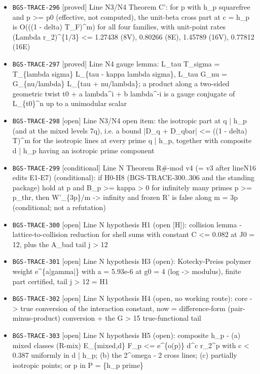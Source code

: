 \begin{itemize}
  \item \texttt{BGS-TRACE-296} [proved] Line N3/N4 Theorem C': for p with h\_p squarefree and p >= p0 (effective, not computed), the unit-beta cross part at c = h\_p is O(((1 - delta) T\_F)\textasciicircum{}m) for all four families, with unit-point rates (Lambda r\_2)\textasciicircum{}\{1/3\} <= 1.27438 (8V), 0.80266 (8E), 1.45789 (16V), 0.77812 (16E)
  \item \texttt{BGS-TRACE-297} [proved] Line N4 gauge lemma: L\_tau T\_sigma = T\_\{lambda sigma\} L\_\{tau - kappa lambda sigma\}, L\_tau G\_nu = G\_\{nu/lambda\} L\_\{tau + nu/lambda\}; a product along a two-sided geometric twist t0 + a lambda\textasciicircum{}i + b lambda\textasciicircum{}-i is a gauge conjugate of L\_\{t0\}\textasciicircum{}n up to a unimodular scalar
  \item \texttt{BGS-TRACE-298} [open] Line N3/N4 open item: the isotropic part at q | h\_p (and at the mixed levels 7q), i.e. a bound |D\_q + D\_qbar| <= ((1 - delta) T)\textasciicircum{}m for the isotropic lines at every prime q | h\_p, together with composite d | h\_p having an isotropic prime component
  \item \texttt{BGS-TRACE-299} [conditional] Line N Theorem R\#-mod v4 (= v3 after lineN16 edits E1-E7) (conditional): if H0-H8 (BGS-TRACE-300..306 and the standing package) hold at p and B\_p >= kappa > 0 for infinitely many primes p >= p\_thr, then W'\_\{3p\}/m -> infinity and frozen R' is false along m = 3p (conditional; not a refutation)
  \item \texttt{BGS-TRACE-300} [open] Line N hypothesis H1 (open [H]): collision lemma - lattice-to-collision reduction for shell sums with constant C <= 0.082 at J0 = 12, plus the A\_bad tail j > 12
  \item \texttt{BGS-TRACE-301} [open] Line N hypothesis H3 (open): Kotecky-Preiss polymer weight e\textasciicircum{}\{a|gamma|\} with a = 5.93e-6 at g0 = 4 (log -> modulus), finite part certified, tail j > 12 = H1
  \item \texttt{BGS-TRACE-302} [open] Line N hypothesis H4 (open, no working route): core -> true conversion of the interaction constant, now = difference-form (pair-minus-product) conversion + the G > 15 true-functional tail
  \item \texttt{BGS-TRACE-303} [open] Line N hypothesis H5 (open): composite h\_p - (a) mixed classes (R-mix) E\_\{mixed,d\} F\_p <= e\textasciicircum{}\{o(p)\} d\textasciicircum{}c r\_2\textasciicircum{}p with c < 0.387 uniformly in d | h\_p; (b) the 2\textasciicircum{}omega - 2 cross lines; (c) partially isotropic points; or p in P = \{h\_p prime\}

\end{itemize}
